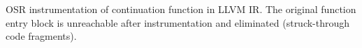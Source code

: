 \label{fig:isordascto} OSR instrumentation of continuation function in LLVM IR. The original function entry block is unreachable after instrumentation and eliminated (struck-through code fragments).
